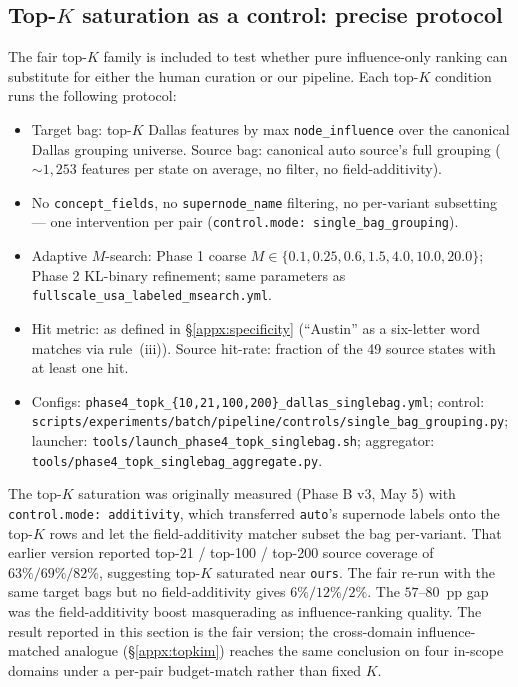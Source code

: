\subsection{Top-$K$ saturation as a control: precise protocol}
The fair top-$K$ family is included to test whether pure influence-only ranking can substitute for either the human curation or our pipeline. Each top-$K$ condition runs the following protocol:

\begin{itemize}\itemsep0pt
\item Target bag: top-$K$ Dallas features by max \texttt{node\_influence} over the canonical Dallas grouping universe. Source bag: canonical auto source's full grouping ($\sim 1{,}253$ features per state on average, no filter, no field-additivity).
\item No \texttt{concept\_fields}, no \texttt{supernode\_name} filtering, no per-variant subsetting --- one intervention per pair (\texttt{control.mode: single\_bag\_grouping}).
\item Adaptive $M$-search: Phase 1 coarse $M \in \{0.1, 0.25, 0.6, 1.5, 4.0, 10.0, 20.0\}$; Phase 2 KL-binary refinement; same parameters as \texttt{fullscale\_usa\_labeled\_msearch.yml}.
\item Hit metric: as defined in \S\ref{appx:specificity} (``Austin'' as a six-letter word matches via rule~(iii)). Source hit-rate: fraction of the 49 source states with at least one hit.
\item Configs: \texttt{phase4\_topk\_\{10,21,100,200\}\_dallas\_singlebag.yml}; control: \texttt{scripts/experiments/batch/pipeline/controls/single\_bag\_grouping.py}; launcher: \texttt{tools/launch\_phase4\_topk\_singlebag.sh}; aggregator: \texttt{tools/phase4\_topk\_singlebag\_aggregate.py}.
\end{itemize}

The top-$K$ saturation was originally measured (Phase B v3, May 5) with \texttt{control.mode: additivity}, which transferred \texttt{auto}'s supernode labels onto the top-$K$ rows and let the field-additivity matcher subset the bag per-variant. That earlier version reported top-21 / top-100 / top-200 source coverage of $63\% / 69\% / 82\%$, suggesting top-$K$ saturated near \texttt{ours}. The fair re-run with the same target bags but no field-additivity gives $6\% / 12\% / 2\%$. The $57$--$80$~pp gap was the field-additivity boost masquerading as influence-ranking quality. The result reported in this section is the fair version; the cross-domain influence-matched analogue (\S\ref{appx:topkim}) reaches the same conclusion on four in-scope domains under a per-pair budget-match rather than fixed $K$.

